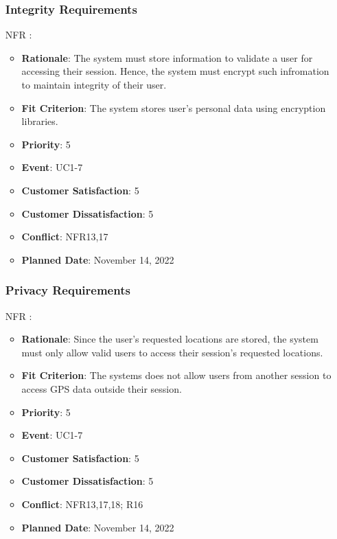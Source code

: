 \documentclass[12pt, titlepage]{article}
\newcounter{reqnum} %
\newcounter{freqnum} %
\begin{document}
\begin{itemize}
\subsubsection{Integrity Requirements}
\item[NFR\refstepcounter{freqnum}\thefreqnum
\label{NFR}:] 
\begin{itemize}
    \item \textbf{Rationale}: The system must store information to validate a user for accessing their session. Hence, the system must encrypt such infromation to maintain integrity of their user.
    \item \textbf{Fit Criterion}: The system stores user's personal data using encryption libraries.
    \item \textbf{Priority}: 5
    \item \textbf{Event}: UC1-7%
    \item \textbf{Customer Satisfaction}: 5
    \item \textbf{Customer Dissatisfaction}: 5
    \item \textbf{Conflict}: NFR13,17
    \item \textbf{Planned Date}: November 14, 2022
\end{itemize}
\subsubsection{Privacy Requirements}
\item[NFR\refstepcounter{freqnum}\thefreqnum
\label{NFR}:] 
\begin{itemize}
    \item \textbf{Rationale}: Since the user's requested locations are stored, the system must only allow valid users to access their session's requested locations.
    \item \textbf{Fit Criterion}: The systems does not allow users from another session to access GPS data outside their session.
    \item \textbf{Priority}: 5
    \item \textbf{Event}: UC1-7%
    \item \textbf{Customer Satisfaction}: 5
    \item \textbf{Customer Dissatisfaction}: 5
    \item \textbf{Conflict}: NFR13,17,18; R16
    \item \textbf{Planned Date}: November 14, 2022
\end{itemize}

\end{itemize}
\end{document}
